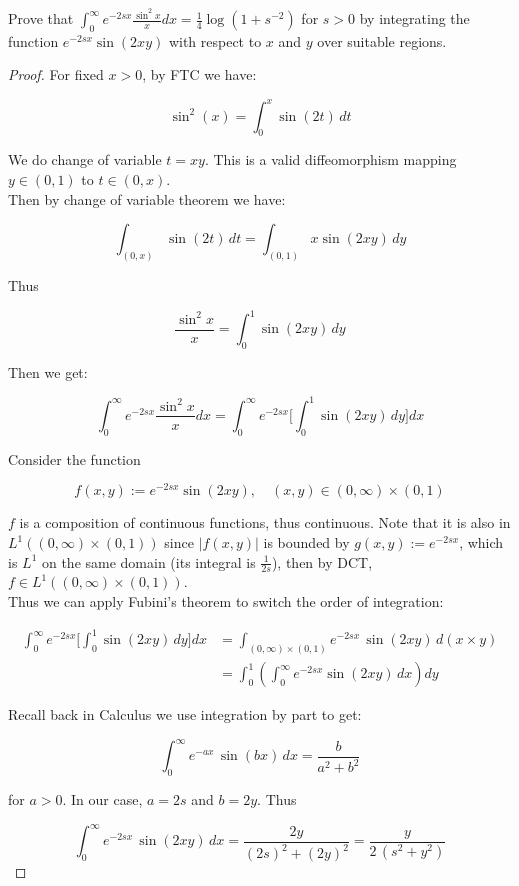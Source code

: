 \documentclass{qlnotes-export}
\begin{document}
Prove that \(\int_{0}^{\infty}e^{- 2sx}\frac{\sin^{2}x}{x} dx = \frac{1}{4}\log(1 + s^{- 2})\) for \(s > 0\) by integrating the function \(e^{- 2sx}\sin(2xy)\) with respect to \(x\) and \(y\) over suitable regions.

\begin{proof}

For fixed \(x > 0\), by FTC we have:

\[\sin^{2}(x) = \int_{0}^{x}\sin(2t)\, dt\]

We do change of variable \(t = xy\). This is a valid diffeomorphism mapping \(y \in (0,1)\) to \(t \in (0,x)\).\\
Then by change of variable theorem we have:

\[\int_{(0,x)}\sin(2t)\, dt = \int_{(0,1)}x\sin(2xy)\, dy\]

Thus

\[\frac{\sin^{2}x}{x} = \int_{0}^{1}\sin(2xy)\, dy\]

Then we get:

\[\int_{0}^{\infty}e^{- 2sx}\frac{\sin^{2}x}{x} dx = \int_{0}^{\infty}e^{- 2sx}\lbrack\int_{0}^{1}\sin(2xy)\, dy\rbrack dx\]

Consider the function

\[f(x,y) := e^{- 2sx}\sin(2xy),\quad(x,y) \in (0,\infty) \times (0,1)\]

\(f\) is a composition of continuous functions, thus continuous. Note that it is also in \(L^{1}((0,\infty) \times (0,1))\) since \(|f(x,y)|\) is bounded by \(g(x,y) := e^{- 2sx}\), which is \(L^{1}\) on the same domain (its integral is \(\frac{1}{2s}\)), then by DCT, \(f \in L^{1}((0,\infty) \times (0,1))\).\\
Thus we can apply Fubini's theorem to switch the order of integration:

\[\begin{matrix}
{\int_{0}^{\infty}e^{- 2sx}\lbrack\int_{0}^{1}\sin(2xy)\, dy\rbrack dx} & {= \int_{(0,\infty) \times (0,1)}e^{- 2sx}\,\sin(2xy)\, d(x \times y)} \\
 & {= \int_{0}^{1}(\int_{0}^{\infty}e^{- 2sx}\sin(2xy)\, dx)dy}
\end{matrix}\]

Recall back in Calculus we use integration by part to get:

\[\int_{0}^{\infty}e^{- ax}\,\sin(bx)\, dx = \frac{b}{a^{2} + b^{2}}\]

for \(a > 0\). In our case, \(a = 2s\) and \(b = 2y\). Thus

\[\int_{0}^{\infty}e^{- 2sx}\,\sin(2xy)\, dx = \frac{2y}{(2s)^{2} + (2y)^{2}} = \frac{y}{2\,(s^{2} + y^{2})}\]


\end{proof}
\end{document}
